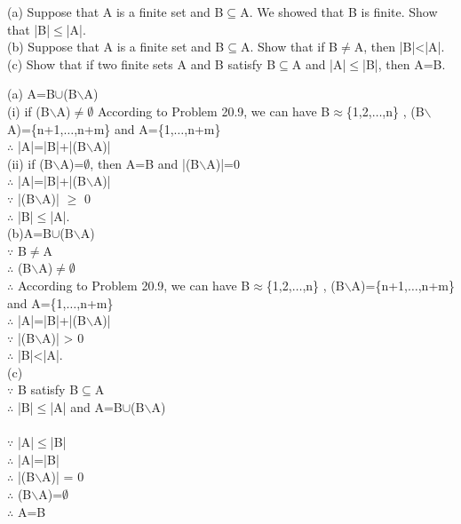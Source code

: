 \documentclass[11pt, a4paper, UTF8]{ctexart}
\begin{document}
\begin{problem}[UD:21.16]
(a) Suppose that A is a finite set and B$\subseteq$A. We showed that B is finite. Show that |B|$\le$|A|.\\
(b) Suppose that A is a finite set and B$\subseteq$A. Show that if B$\not=$A, then |B|<|A|.\\
(c) Show that if two finite sets A and B satisfy B$\subseteq$A and |A|$\le$|B|, then A=B.
\end{problem}
\begin{solution}
(a) A=B$\cup$(B$\backslash$A)\\
(i) if (B$\backslash$A)$\not=$$\emptyset$ According to Problem 20.9, we can have B$\approx$\{1,2,$\dots$,n\} , (B$\backslash$A)=\{n+1,$\dots$,n+m\} and A=\{1,$\dots$,n+m\}\\
$\therefore$ |A|=|B|+|(B$\backslash$A)| \\
(ii) if (B$\backslash$A)=$\emptyset$, then A=B and |(B$\backslash$A)|=0\\
$\therefore$ |A|=|B|+|(B$\backslash$A)| \\
$\because$ |(B$\backslash$A)| $\ge$ 0\\
$\therefore$ |B|$\le$|A|.\\
(b)A=B$\cup$(B$\backslash$A)\\
$\because$ B$\not=$A\\
$\therefore$ (B$\backslash$A)$\not=$$\emptyset$\\
$\therefore$ According to Problem 20.9, we can have B$\approx$\{1,2,$\dots$,n\} , (B$\backslash$A)=\{n+1,$\dots$,n+m\} and A=\{1,$\dots$,n+m\}\\
$\therefore$ |A|=|B|+|(B$\backslash$A)| \\
$\because$ |(B$\backslash$A)| > 0\\
$\therefore$ |B|<|A|.\\
(c)\\
$\because$ B satisfy B$\subseteq$A\\
$\therefore$ |B|$\le$|A| and A=B$\cup$(B$\backslash$A)\\\\
$\because$ |A|$\le$|B|\\
$\therefore$ |A|=|B|\\
$\therefore$ |(B$\backslash$A)| = 0\\
$\therefore$ (B$\backslash$A)=$\emptyset$\\
$\therefore$ A=B
\end{solution}
\end{document}
